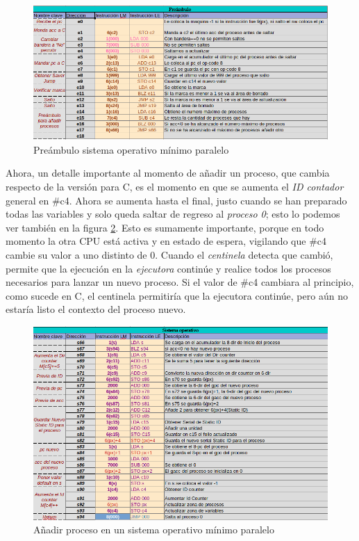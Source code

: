 \documentclass[letterpaper,12pt,oneside]{book}
\begin{document}
			\begin{figure}[h]		
				\centering
				\includegraphics[scale=0.55]{media/Paralela/somp_preambulo.png}
				\caption{ Preámbulo sistema operativo mínimo paralelo}
				\label{fig:somp_preambulo}
			\end{figure}	
			
			Ahora, un detalle importante al momento de añadir un proceso, que cambia respecto de la versión para C, es el momento en que se aumenta 
			el 
			\textit{ID contador} general en \#c4. Ahora se aumenta hasta el final, justo cuando se han preparado todas las variables y solo queda
			saltar de regreso al \textit{proceso 0}; esto lo podemos ver también en la figura \ref{fig:somp_add_process}. Esto es sumamente importante, 
			porque en todo momento la 
			otra CPU está activa y en estado de espera, vigilando que
			\#c4 cambie su valor a uno distinto de 0. Cuando el \textit{centinela} detecta que cambió, permite que la ejecución en la
			 \textit{ejecutora} continúe y 
			 realice todos los procesos necesarios para lanzar un nuevo proceso. Si el valor de \#c4 cambiara al principio, 
			 como sucede 
			 en C, el centinela permitiría que la ejecutora continúe, pero aún no estaría listo el contexto del proceso nuevo.
			
			
			\begin{figure}[h]		
				\centering
				\includegraphics[scale=0.57]{media/Paralela/somp_add_process.png}
				\caption{ Añadir proceso en un sistema operativo mínimo paralelo}
				\label{fig:somp_add_process}
			\end{figure}	
			
\end{document}
